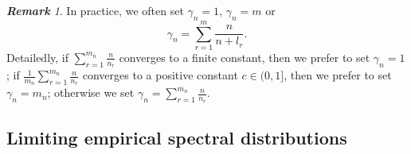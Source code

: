 \documentclass[12pt]{article}
\theoremstyle{plain}
\theoremstyle{definition}
\theoremstyle{remark}
\newtheorem{rem}{\textbf{Remark}}
\begin{document}
\begin{rem}
	In practice, we often set $\gamma_{n}=1$,	$\gamma_{n}=m$ or 
	\begin{equation*}
	\gamma_{n}=\sum_{r=1}^{m} \frac{n}{n+l_{r}}.
	\end{equation*}
	Detailedly, if $\sum_{r=1}^{m_n}\frac{n}{n_r}$ converges to a finite constant, then we prefer to set $\gamma_n=1$; if $\frac{1}{m_n}\sum_{r=1}^{m_n}\frac{n}{n_r}$ converges to a positive constant $c\in (0,1]$, then we prefer to set $\gamma_n=m_n$; otherwise we set $\gamma_n=\sum_{r=1}^{m_n}\frac{n}{n_r}$.
\end{rem}


\subsection{Limiting empirical spectral distributions}
\end{document}
